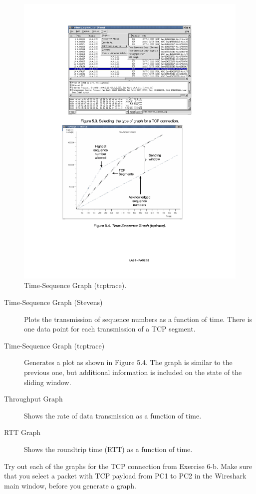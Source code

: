 \begin{enumerate}
\begin{figure}[ht]
			\includegraphics{graphics/fig-5-4-updated.pdf}	
			\caption{Time-Sequence Graph (tcptrace).}
			\label{fig:lab5-time-sequence}
		\end{figure}
		\begin{description}
			\item[Time-Sequence Graph (Stevens)] Plots the transmission of sequence numbers as a function of time. There is one data point for each transmission of a TCP segment.
			\item[Time-Sequence Graph (tcptrace)] Generates a plot as shown in Figure 5.4. The graph is similar to the previous one, but additional information is included on the state of the sliding window.
			\item[Throughput Graph] Shows the rate of data transmission as a function of time.
			\item[RTT Graph] Shows the roundtrip time (RTT) as a function of time.
		\end{description}
		Try out each of the graphs for the TCP connection from Exercise 6-b. Make sure that you select a packet with TCP payload from PC1 to PC2 in the Wireshark main window, before you generate a graph.

\end{enumerate}
